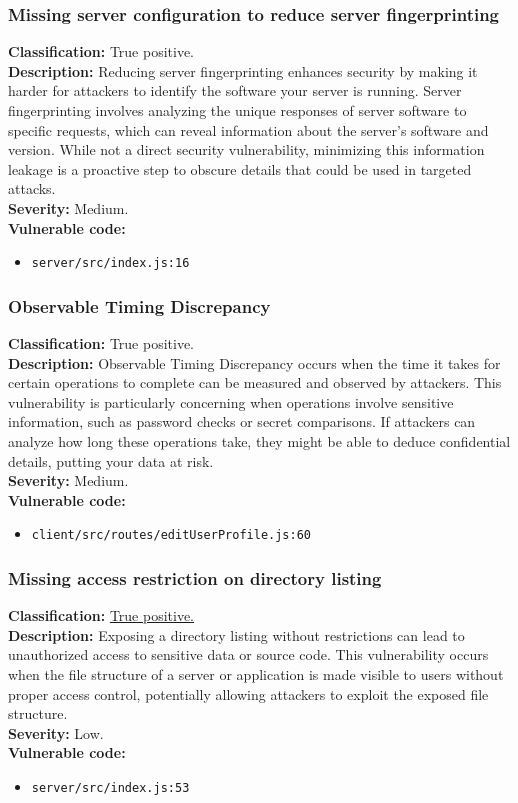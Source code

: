 \documentclass[]{article}
\begin{document}
\subsubsection{Missing server configuration to reduce server fingerprinting}
\textbf{Classification:} True positive. \\
\textbf{Description:} Reducing server fingerprinting enhances security by making it harder for attackers to identify the software your server is running. Server fingerprinting involves analyzing the unique responses of server software to specific requests, which can reveal information about the server's software and version. While not a direct security vulnerability, minimizing this information leakage is a proactive step to obscure details that could be used in targeted attacks. \\ 
\textbf{Severity:} Medium. \\ 
\textbf{Vulnerable code:}
\begin{itemize}
    \item \texttt{server/src/index.js:16}
\end{itemize}

\subsubsection{Observable Timing Discrepancy}
\textbf{Classification:} True positive. \\
\textbf{Description:} Observable Timing Discrepancy occurs when the time it takes for certain operations to complete can be measured and observed by attackers. This vulnerability is particularly concerning when operations involve sensitive information, such as password checks or secret comparisons. If attackers can analyze how long these operations take, they might be able to deduce confidential details, putting your data at risk. \\ 
\textbf{Severity:} Medium. \\ 
\textbf{Vulnerable code:}
\begin{itemize}
    \item \texttt{client/src/routes/editUserProfile.js:60}
\end{itemize}

\subsubsection{Missing access restriction on directory listing}
\textbf{Classification:} \hyperref[subsubsec:exposure_of_information_through_directory_listing]{True positive.} \\
\textbf{Description:} Exposing a directory listing without restrictions can lead to unauthorized access to sensitive data or source code. This vulnerability occurs when the file structure of a server or application is made visible to users without proper access control, potentially allowing attackers to exploit the exposed file structure. \\ 
\textbf{Severity:} Low. \\ 
\textbf{Vulnerable code:}
\begin{itemize}
    \item \texttt{server/src/index.js:53}
\end{itemize}
\end{document}
